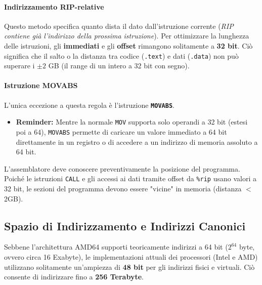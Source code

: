 \documentclass[a4paper,12pt]{article}
\begin{document}
	\paragraph{Indirizzamento RIP-relative}
	Questo metodo specifica quanto dista il dato dall'istruzione corrente (\textit{RIP contiene già l'indirizzo della prossima istruzione}). 
	Per ottimizzare la lunghezza delle istruzioni, gli \textbf{immediati} e gli \textbf{offset} rimangono solitamente a \textbf{32 bit}. Ciò significa che il salto o la distanza tra codice (\texttt{.text}) e dati (\texttt{.data}) non può superare i $\pm 2$ GB (il range di un intero a 32 bit con segno).
	
	\paragraph{Istruzione MOVABS}
	L'unica eccezione a questa regola è l'istruzione \textbf{\texttt{MOVABS}}. 
	\begin{itemize}
		\item \textbf{Reminder:} Mentre la normale \texttt{MOV} supporta solo operandi a 32 bit (estesi poi a 64), \texttt{MOVABS} permette di caricare un valore immediato a 64 bit direttamente in un registro o di accedere a un indirizzo di memoria assoluto a 64 bit.
	\end{itemize}
	
	\begin{tcolorbox}[colback=red!5!white,colframe=red!75!black,title=Vincolo dei 2GB]
		L'assemblatore deve conoscere preventivamente la posizione del programma. Poiché le istruzioni \texttt{CALL} e gli accessi ai dati tramite offset da \texttt{\%rip} usano valori a 32 bit, le sezioni del programma devono essere "vicine" in memoria (distanza $<$ 2GB).
	\end{tcolorbox}
	
	\subsection{Spazio di Indirizzamento e Indirizzi Canonici}
	
	Sebbene l'architettura AMD64 supporti teoricamente indirizzi a 64 bit ($2^{64}$ byte, ovvero circa 16 Exabyte), le implementazioni attuali dei processori (Intel e AMD) utilizzano solitamente un'ampiezza di \textbf{48 bit} per gli indirizzi fisici e virtuali. Ciò consente di indirizzare fino a \textbf{256 Terabyte}.
	
\end{document}
